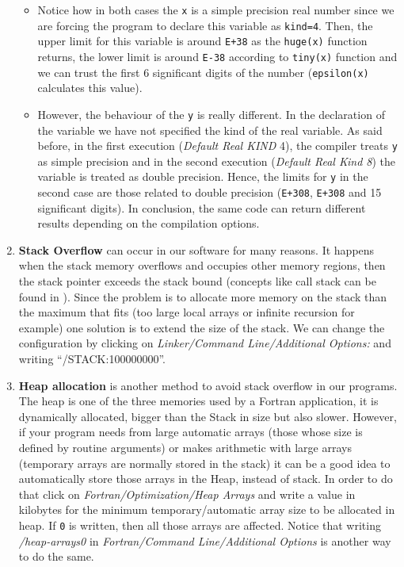 \begin{enumerate}
\begin{IN}
    \begin{itemize}
\item Notice how in both cases the \verb|x| is a simple precision real number since we are forcing the program to declare this variable as \verb|kind=4|. Then, the upper limit for this variable is around \texttt{E+38} as the \verb|huge(x)| function returns, the lower limit is around \texttt{E-38} according to \verb|tiny(x)| function and we can trust the first 6 significant digits of the number (\verb|epsilon(x)| calculates this value). 

\item However, the behaviour of the \verb|y| is really different. In the declaration of the variable we have not specified the kind of the real variable. As said before, in the first execution (\textit{Default Real KIND} 4), the compiler treats \verb|y| as simple precision and in the second execution (\textit{Default Real Kind 8}) the variable is treated as double precision. Hence, the limits for \verb|y| in the second case are those related to double precision (\texttt{E+308}, \texttt{E+308} and 15 significant digits). In conclusion, the same code can return different results depending on the compilation options.
    \end{itemize}
\end{IN}   
    

    \item \textbf{Stack Overflow} can occur in our software for many reasons. It happens when the stack memory overflows and occupies other memory regions, then the stack pointer exceeds the stack bound \citep{stack} (concepts like call stack can be found in \citep{stack2}). Since the problem is to allocate more memory on the stack than the maximum that fits (too large local arrays or infinite recursion for example) one solution is to extend the size of the stack. We can change the configuration by clicking on \textit{Linker/Command Line/Additional Options:} and writing ``/STACK:100000000''.
    
    \item \textbf{Heap allocation} is another method to avoid stack overflow in our programs. The heap is one of the three memories used by a Fortran application, it is dynamically allocated, bigger than the Stack in size but also slower. However, if your program needs from large automatic arrays (those whose size is defined by routine arguments) or makes arithmetic with large arrays (temporary arrays are normally stored in the stack) it can be a good idea to automatically store those arrays in the Heap, instead of stack. In order to do that click on \textit{Fortran/Optimization/Heap Arrays} and write a value in kilobytes for the minimum temporary/automatic array size to be allocated in heap. If \texttt{0} is written, then all those arrays are affected. Notice that writing \textit{/heap-arrays0} in \textit{Fortran/Command Line/Additional Options} is another way to do the same. 
    

\end{enumerate}

